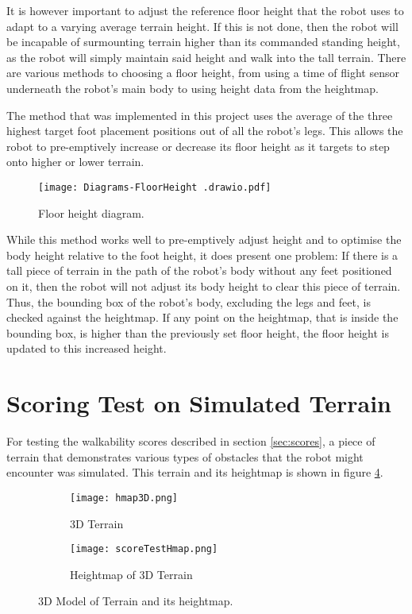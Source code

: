     It is however important to adjust the reference floor height that the robot uses to adapt to a varying average terrain height. If this is not done, then the robot will be incapable of surmounting terrain higher than its commanded standing height, as the robot will simply maintain said height and walk into the tall terrain. There are various methods to choosing a floor height, from using a time of flight sensor underneath the robot's main body to using height data from the heightmap.

    The method that was implemented in this project uses the average of the three highest target foot placement positions out of all the robot's legs. This allows the robot to pre-emptively increase or decrease its floor height as it targets to step onto higher or lower terrain.

    \begin{figure}[h]
        \centering
        \texttt{[image: Diagrams-FloorHeight .drawio.pdf]}
        \caption{Floor height diagram.}
        \label{fig:floor_height}
    \end{figure}

    \noindent
    While this method works well to pre-emptively adjust height and to optimise the body height relative to the foot height, it does present one problem: If there is a tall piece of terrain in the path of the robot's body without any feet positioned on it, then the robot will not adjust its body height to clear this piece of terrain. Thus, the bounding box of the robot's body, excluding the legs and feet, is checked against the heightmap. If any point on the heightmap, that is inside the bounding box, is higher than the previously set floor height, the floor height is updated to this increased height.

    \newpage
    \section{Scoring Test on Simulated Terrain} \label{sec:test_scores}
    For testing the walkability scores described in section \ref{sec:scores}, a piece of terrain that demonstrates various types of obstacles that the robot might encounter was simulated. This terrain and its heightmap is shown in figure \ref{fig:score_test_map}.
    \begin{figure}[h]
        \centering
        \begin{subfigure}{.5\textwidth}
            \texttt{[image: hmap3D.png]}
            \caption{3D Terrain}
            \label{fig:sub_3d_terrain}
        \end{subfigure}%
        \begin{subfigure}{.5\textwidth}
            \texttt{[image: scoreTestHmap.png]}
            \caption{Heightmap of 3D Terrain}
            \label{fig:sub_3d_terrain_hmap}
        \end{subfigure}
        \caption{3D Model of Terrain and its heightmap.}
        \label{fig:score_test_map}
    \end{figure}

